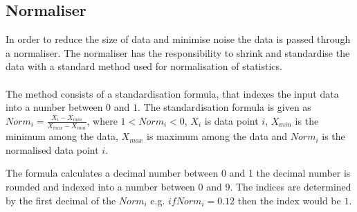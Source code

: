 \subsection{Normaliser}
\label{sec:normaliser}
In order to reduce the size of data and minimise noise the data is passed through a normaliser. The normaliser has the responsibility to shrink and standardise the data with a standard method used for normalisation of statistics.
\\\\
The method consists of a standardisation formula, that indexes the input data into a number between $0$ and $1$.
The standardisation formula is given as 
$Norm_{i} =\frac{X_i-X_{min}}{X_{max}-X_{min}}$, where $1 < Norm_i < 0$, $X_i$ is data point $i$, $X_{min}$ is the minimum among the data, $X_{max}$ is maximum among the data and $Norm_i$ is the normalised data point $i$.

The formula calculates a decimal number between 0 and 1 the decimal number is rounded and indexed into a number between 0 and 9. The indices are determined by the first decimal of the $Norm_i$ e.g. $if Norm_i = 0.12$ then the index would be $1$. 